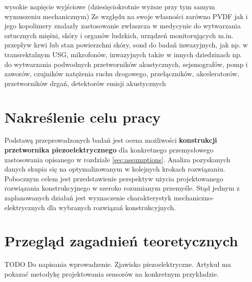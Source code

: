 wysokie napięcie wyjściowe (dziesięciokrotnie wyższe przy tym samym wymuszeniu 
mechanicznym) \cite{To_Do}
Ze względu na swoje własności zarówno PVDF jak i jego kopolimery znalazły zastosowanie 
zwłaszcza w medycynie do wytwarzania sztucznych mięśni, skóry i organów ludzkich, 
urządzeń monitorujących m.in. przepływ krwi lub stan powierzchni skóry, sond do badań 
inwazyjnych, jak np. w transrektalnym USG, mikrofonów, inwazyjnych także w innych 
dziedzinach np. do wytwarzania podwodnych przetworników akustycznych, sejsmografów, 
pomp i zaworów, czujników natężenia ruchu drogowego, przełączników, akceleratorów, 
przetworników drgań, detektorów emisji akustycznych \cite{To_Do}





\section{Nakreślenie celu pracy}
\label{sec:thesis_goal}
Podstawą przeprowadzonych badań jest ocena możliwości \textbf{konstrukcji przetwornika 
piezoelektrycznego} dla konkretnego przemysłowego zastosowania opisanego w rozdziale
\ref{sec:assumptions}. Analiza pozyskanych danych skupia się na optymalizowanym
w kolejnych krokach rozwiązaniu. Pobocznym celem jest przedstawienie perspektyw użycia
projektowanego rozwiązania konstrukcyjnego w szeroko rozumianym przemyśle. Stąd jednym
z zaplanowanych działań jest wyznaczenie charakterystyk mechaniczno-elektrycznych dla 
wybranych rozwiązań konstrukcyjnych. 

\section{Przegląd zagadnień teoretycznych}
\label{sec:theory}

TODO
Do napisania wprowadzenie. Zjawisko piezoelektryczne. 
Artykuł ma pokazać metodykę projektowania sensorów na konkretnym przykładzie.